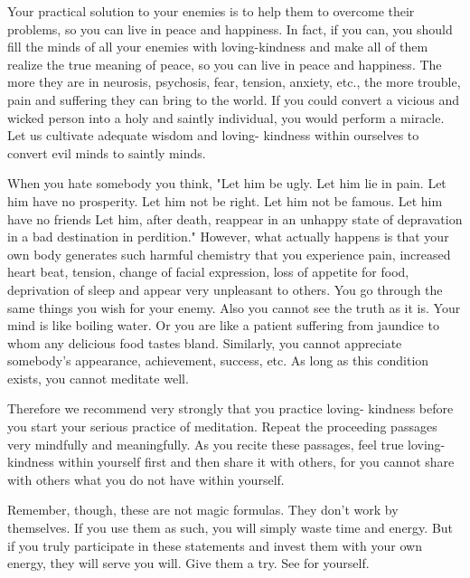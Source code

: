 Your practical solution to your enemies is to help them to overcome their
problems, so you can live in peace and happiness. In fact, if you can, you
should fill the minds of all your enemies with loving-kindness and make all of
them realize the true meaning of peace, so you can live in peace and happiness.
The more they are in neurosis, psychosis, fear, tension, anxiety, etc., the more
trouble, pain and suffering they can bring to the world. If you could convert a
vicious and wicked person into a holy and saintly individual, you would perform
a miracle. Let us cultivate adequate wisdom and loving- kindness within
ourselves to convert evil minds to saintly minds.

When you hate somebody you think, "Let him be ugly. Let him lie in pain. Let him
have no prosperity. Let him not be right.  Let him not be famous. Let him have
no friends Let him, after death, reappear in an unhappy state of depravation in
a bad destination in perdition." However, what actually happens is that your own
body generates such harmful chemistry that you experience pain, increased heart
beat, tension, change of facial expression, loss of appetite for food,
deprivation of sleep and appear very unpleasant to others. You go through the
same things you wish for your enemy.  Also you cannot see the truth as it is.
Your mind is like boiling water. Or you are like a patient suffering from
jaundice to whom any delicious food tastes bland. Similarly, you cannot
appreciate somebody's appearance, achievement, success, etc. As long as this
condition exists, you cannot meditate well.

Therefore we recommend very strongly that you practice loving- kindness before
you start your serious practice of meditation.  Repeat the proceeding passages
very mindfully and meaningfully. As you recite these passages, feel true
loving-kindness within yourself first and then share it with others, for you
cannot share with others what you do not have within yourself.

Remember, though, these are not magic formulas. They don't work by themselves.
If you use them as such, you will simply waste time and energy. But if you truly
participate in these statements and invest them with your own energy, they will
serve you will. Give them a try. See for yourself.
